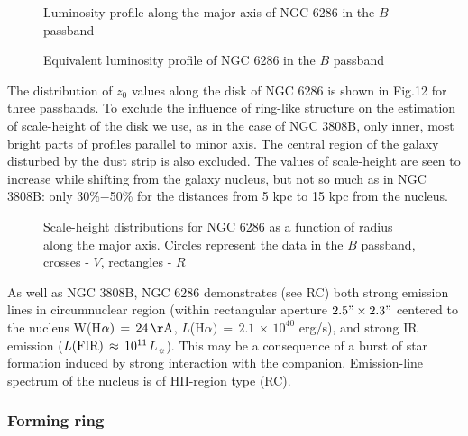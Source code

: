 \begin{figure}
\picplace{1.5cm}
\caption[10]{Luminosity profile along the major axis of NGC 6286
in the $B$ passband}
\end{figure}

\begin{figure}
\picplace{1.5cm}
\caption[11]{Equivalent luminosity profile of NGC 6286 in the
$B$ passband}
\end{figure}

The distribution of $z_{0}$ values along the disk of NGC 6286
is shown in Fig.12 for three passbands. To exclude the 
influence of ring-like structure on the estimation of 
scale-height of the disk we use, as in the case of NGC 3808B,
only inner, most bright parts of profiles parallel to minor
axis. The central region of the galaxy disturbed by the dust
strip is also excluded. The values of scale-height are seen to
increase while shifting from the galaxy nucleus, but not so much
as in NGC 3808B: only 30\%$-$50\% for the distances from
5 kpc to 15 kpc from the nucleus.

\begin{figure}
\picplace{1.5cm}
\caption[12]{
Scale-height distributions for NGC 6286 as a function of
radius along the major axis. Circles represent the data in the
$B$ passband, crosses - $V$, rectangles - $R$}
\end{figure}

As well as NGC 3808B, NGC 6286 demonstrates (see RC) both
strong emission lines in circumnuclear region (within
rectangular aperture $\rm 2.5"\times2.3"$ centered to the
nucleus W(H$\alpha)\,=\,24\,\rm\AA$, $L$(H$\alpha)\,=\,2.1\,\times\,
10^{40}$ erg/s), and strong IR emission
($L\rm (FIR)\,\approx\,10^{11}$$L_{\sun}$). This may be a
consequence of a burst of star formation induced by strong
interaction with the companion. Emission-line spectrum of
the nucleus is of HII-region type (RC).

\subsubsection{Forming ring}

